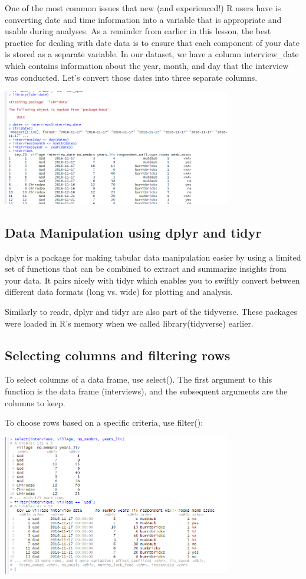 \documentclass{article}
\begin{document}
One of the most common issues that new (and experienced!) R users have is converting date and time information into a variable that is appropriate and usable during analyses. As a reminder from earlier in this lesson, the best practice for dealing with date data is to ensure that each component of your date is stored as a separate variable. In our dataset, we have a column interview\_date which contains information about the year, month, and day that the interview was conducted. Let’s convert those dates into three separate columns.


\includegraphics[width=10cm]{Images/RStudio033.PNG}

\subsection{Data Manipulation using dplyr and tidyr}

dplyr is a package for making tabular data manipulation easier by using a limited set of functions that can be combined to extract and summarize insights from your data. It pairs nicely with tidyr which enables you to swiftly convert between different data formats (long vs. wide) for plotting and analysis.

Similarly to readr, dplyr and tidyr are also part of the tidyverse. These packages were loaded in R’s memory when we called library(tidyverse) earlier.

\subsection{Selecting columns and filtering rows}

To select columns of a data frame, use select(). The first argument to this function is the data frame (interviews), and the subsequent arguments are the columns to keep.

To choose rows based on a specific criteria, use filter():

\includegraphics[width=10cm]{Images/RStudio034.PNG}
\end{document}
